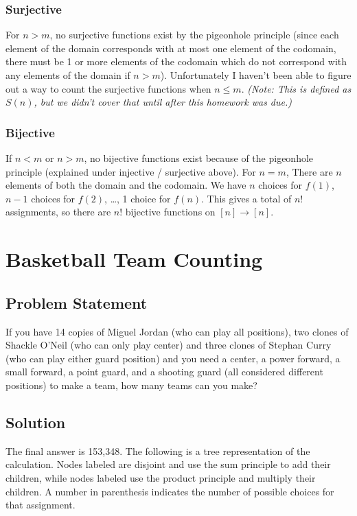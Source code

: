 \documentclass[12pt]{article}
\begin{document}
\subsubsection*{Surjective}
For $n > m$, no surjective functions exist by the pigeonhole principle (since each element of the domain corresponds with at most one element of the codomain, there must be 1 or more elements of the codomain which do not correspond with any elements of the domain if $n > m$). Unfortunately I haven't been able to figure out a way to count the surjective functions when $n \leq m$. \emph{(Note: This is defined as $S(n)$, but we didn't cover that until after this homework was due.)}

\subsubsection*{Bijective}

If $n < m$ or $n > m$, no bijective functions exist because of the pigeonhole principle (explained under injective / surjective above). For $n = m$, There are $n$ elements of both the domain and the codomain. We have $n$ choices for $f(1)$, $n-1$ choices for $f(2)$, \ldots, 1 choice for $f(n)$. This gives a total of $n!$ assignments, so there are $n!$ bijective functions on $[n] \rightarrow [n]$.

\section{Basketball Team Counting}

\subsection*{Problem Statement}
If you have 14 copies of Miguel Jordan (who can play all positions), two clones of Shackle O'Neil (who can only play center) and three clones of Stephan Curry (who can play either guard position) and you need a center, a power forward, a small forward, a point guard, and a shooting guard (all considered different positions) to make a team, how many teams can you make?
\subsection*{Solution}

The final answer is 153,348. The following is a tree representation of the calculation. Nodes labeled  are disjoint and use the sum principle to add their children, while nodes labeled  use the product principle and multiply their children. A number in parenthesis indicates the number of possible choices for that assignment. 
\end{document}
